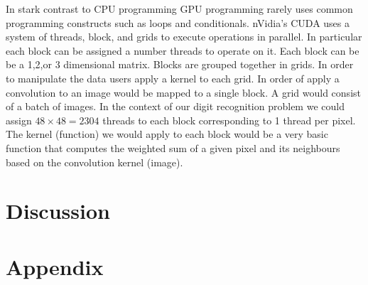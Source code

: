 \documentclass[10pt,twocolumn]{article}
\begin{document}
In stark contrast to CPU programming GPU programming rarely uses common programming constructs such as loops and conditionals. nVidia\textsuperscript{\textregistered}'s CUDA uses a system of threads, block, and grids to execute operations in parallel. In particular each block can be assigned a number threads to operate on it. Each block can be be a 1,2,or 3 dimensional matrix. Blocks are grouped together in grids. In order to manipulate the data  users apply a kernel to each grid. In order of apply a convolution to an image would be mapped to a single block. A grid would consist of a batch of images. In the context of our digit recognition problem we could assign $48 \times 48 = 2304$ threads to each block corresponding to 1 thread per pixel. The kernel (function) we would apply to each block would be a very basic function that computes the weighted sum of a given pixel and its neighbours based on the convolution kernel (image).
\section{Discussion}


\section*{Appendix}
\end{document}
